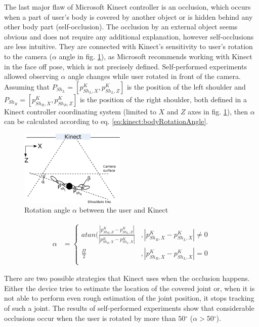 \documentclass[sensors,article,submit,moreauthors,pdftex,10pt,a4paper]{mdpi}
\newcommand{\degree}{\ensuremath{{}^{\circ}}\xspace}
\begin{document}
The last major flaw of Microsoft Kinect controller is an occlusion, which occurs when a part of user’s body is covered by another object or is hidden behind any other body part (self-occlusion). The occlusion by an external object seems obvious and does not require any additional explanation, however self-occlusions are less intuitive. They are connected with Kinect’s sensitivity to user’s rotation to the camera ($\alpha$ angle in fig. \ref{fig:kinect:rotationAngle}), as Microsoft recommends working with Kinect in the face off pose, which is not precisely defined. Self-performed experiments allowed observing $\alpha$ angle changes while user rotated in front of the camera. Assuming that $P_{Sh_L} = [p^K_{{Sh}_L,X} , p^K_{{Sh}_L,Z}]$ is the position of the left shoulder and $P_{Sh_R} = [p^K_{{Sh}_R,X} , p^K_{{Sh}_R,Z}]$ is the position of the right shoulder, both defined in a Kinect controller coordinating system (limited to $X$ and $Z$ axes in fig. \ref{fig:kinect:rotationAngle}), then $\alpha$ can be calculated according to eq. \ref{eq:kinect:bodyRotationAngle}.
	
\begin{figure}[H] %
	\centering
	\includegraphics[width=5cm]{Figure3.png}
	\caption{Rotation angle $\alpha$ between the user and Kinect}
	\label{fig:kinect:rotationAngle} 
\end{figure}
	
\begin{equation}
	\label{eq:kinect:bodyRotationAngle}
	\begin{split}
		\alpha &= 
		\begin{cases} 
			atan(\frac{|p^K_{{Sh}_R,Z} - p^K_{{Sh}_L,Z}|}{|p^K_{{Sh}_R,X} - p^K_{{Sh}_L,X}|} & , |p^K_{{Sh}_R,X} - p^K_{{Sh}_L,X}| \neq 0 \\
			\frac{\Pi}{2}                                                                    & , |p^K_{{Sh}_R,X} - p^K_{{Sh}_L,X}| = 0    \\		
		\end{cases}
	\end{split}
\end{equation}
	
There are two possible strategies that Kinect uses when the occlusion happens. Either the device tries to estimate the location of the covered joint or, when it is not able to perform even rough estimation of the joint position, it stops tracking of such a joint. The results of self-performed experiments show that considerable occlusions occur when the user is rotated by more than $50\degree$ ($\alpha > 50\degree$). 
	
\end{document}
